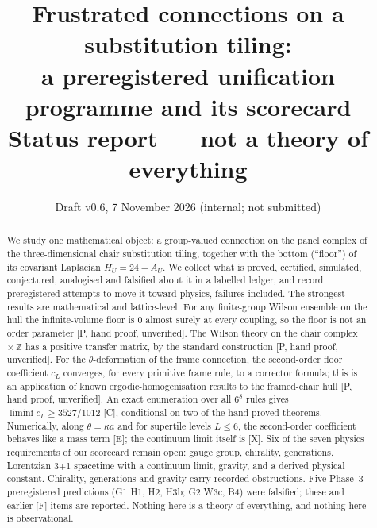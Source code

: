 \documentclass[11pt]{article}
\title{Frustrated connections on a substitution tiling:\\ a preregistered unification programme and its scorecard\\[4pt]
\large Status report --- not a theory of everything}
\author{\todo{author list and affiliations (placeholder)}}
\date{Draft v0.6, 7 November 2026 (internal; not submitted)}
\begin{document}
\maketitle

\begin{abstract}
We study one mathematical object: a group-valued connection on the panel complex of the three-dimensional chair substitution tiling, together with the bottom (``floor'') of its covariant Laplacian $H_U=24-A_U$. We collect what is proved, certified, simulated, conjectured, analogised and falsified about it in a labelled ledger, and record preregistered attempts to move it toward physics, failures included.
The strongest results are mathematical and lattice-level. For any finite-group Wilson ensemble on the hull the infinite-volume floor is $0$ almost surely at every coupling, so the floor is not an order parameter [P, hand proof, unverified]. The Wilson theory on the chair complex $\times\,\mathbb{Z}$ has a positive transfer matrix, by the standard construction [P, hand proof, unverified]. For the $\theta$-deformation of the frame connection, the second-order floor coefficient $c_L$ converges, for every primitive frame rule, to a corrector formula; this is an application of known ergodic-homogenisation results to the framed-chair hull [P, hand proof, unverified]. An exact enumeration over all $6^8$ rules gives $\liminf c_L\ge 3527/1012$ [C], conditional on two of the hand-proved theorems. Numerically, along $\theta=\kappa a$ and for supertile levels $L\le6$, the second-order coefficient behaves like a mass term [E]; the continuum limit itself is [X].
Six of the seven physics requirements of our scorecard remain open: gauge group, chirality, generations, Lorentzian 3+1 spacetime with a continuum limit, gravity, and a derived physical constant. Chirality, generations and gravity carry recorded obstructions. Five Phase~3 preregistered predictions (G1 H1, H2, H3b; G2 W3c, B4) were falsified; these and earlier [F] items are reported. Nothing here is a theory of everything, and nothing here is observational.
\end{abstract}
\end{document}
